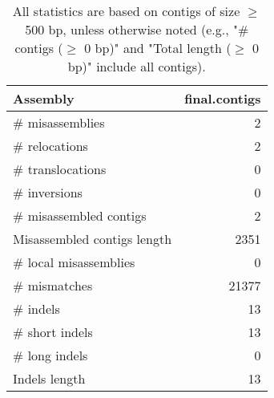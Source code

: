 \documentclass[12pt,a4paper]{article}
\begin{document}
\begin{table}[ht]
\begin{center}
\caption{All statistics are based on contigs of size $\geq$ 500 bp, unless otherwise noted (e.g., "\# contigs ($\geq$ 0 bp)" and "Total length ($\geq$ 0 bp)" include all contigs).}
\begin{tabular}{|l*{1}{|r}|}
\hline
Assembly & final.contigs \\ \hline
\# misassemblies & 2 \\ \hline
\hspace{5mm}\# relocations & 2 \\ \hline
\hspace{5mm}\# translocations & 0 \\ \hline
\hspace{5mm}\# inversions & 0 \\ \hline
\# misassembled contigs & 2 \\ \hline
Misassembled contigs length & 2351 \\ \hline
\# local misassemblies & 0 \\ \hline
\# mismatches & 21377 \\ \hline
\# indels & 13 \\ \hline
\hspace{5mm}\# short indels & 13 \\ \hline
\hspace{5mm}\# long indels & 0 \\ \hline
Indels length & 13 \\ \hline
\end{tabular}
\end{center}
\end{table}
\end{document}

